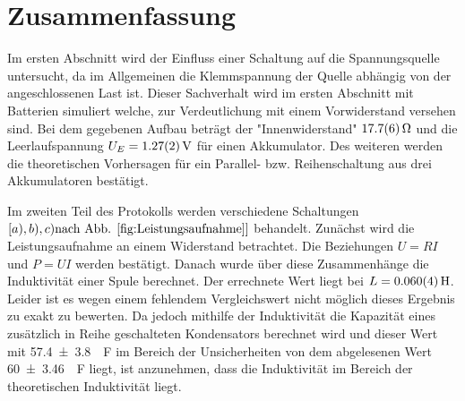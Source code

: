 
\section{Zusammenfassung}
Im ersten Abschnitt wird der Einfluss einer Schaltung auf die Spannungsquelle untersucht, da im Allgemeinen die Klemmspannung der Quelle abhängig von der angeschlossenen Last ist. Dieser Sachverhalt wird im ersten Abschnitt mit Batterien simuliert welche, zur Verdeutlichung mit einem Vorwiderstand versehen sind. Bei dem gegebenen Aufbau beträgt der "Innenwiderstand" $\SI{17.7+-0.6}{\ohm}$ und die Leerlaufspannung $U_E=\SI{1.27+-0.02}{V}$ für einen Akkumulator. Des weiteren werden die theoretischen Vorhersagen für ein Parallel- bzw. Reihenschaltung aus drei Akkumulatoren bestätigt.

Im zweiten Teil des Protokolls werden verschiedene Schaltungen  $\left[ a),b),c) \text{nach Abb. \ref{fig:Leistungsaufnahme}} \right]$ behandelt.
Zunächst wird die Leistungsaufnahme an einem Widerstand betrachtet. Die Beziehungen $U=RI$ und $P=UI$ werden bestätigt.
Danach wurde über diese Zusammenhänge die Induktivität einer Spule berechnet.
Der errechnete Wert liegt bei $L= \SI{0,060+-0,004}{H}$. Leider ist es wegen einem fehlendem Vergleichswert nicht möglich dieses Ergebnis zu exakt zu bewerten. 
Da jedoch  mithilfe der Induktivität die Kapazität eines zusätzlich in Reihe geschalteten Kondensators berechnet wird und dieser Wert mit \SI{57.4+-3.8}{\mu F} im Bereich der Unsicherheiten von dem abgelesenen Wert \SI{60+-3.46}{\mu F} liegt, ist anzunehmen, dass die Induktivität im Bereich der theoretischen Induktivität liegt.






